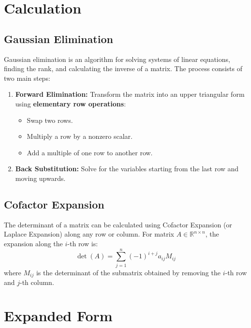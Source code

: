 \documentclass{article}
\begin{document}
\newpage
\section{Calculation}

\subsection{Gaussian Elimination}
\label{subsec:gauss}

Gaussian elimination is an algorithm for solving systems of linear equations, finding the rank, and calculating the inverse of a matrix. The process consists of two main steps:

\begin{enumerate}
    \item \textbf{Forward Elimination:} Transform the matrix into an upper triangular form using \textbf{elementary row operations}:
    \begin{itemize}
        \item Swap two rows.
        \item Multiply a row by a nonzero scalar.
        \item Add a multiple of one row to another row.
    \end{itemize}
    \item \textbf{Back Substitution:} Solve for the variables starting from the last row and moving upwards.
\end{enumerate}

\subsection{Cofactor Expansion}
\label{subsec:cofactor}
The determinant of a matrix can be calculated using Cofactor Expansion (or Laplace Expansion) along any row or column. For matrix $A \in \mathbb{R}^{n \times n}$, the expansion along the $i$-th row is:
\[
    \det(A) = \sum_{j=1}^{n} (-1)^{i+j} a_{ij} M_{ij}
\]
where $M_{ij}$ is the determinant of the submatrix obtained by removing the $i$-th row and $j$-th column.


\newpage
\appendix
\section{Expanded Form}
\end{document}
